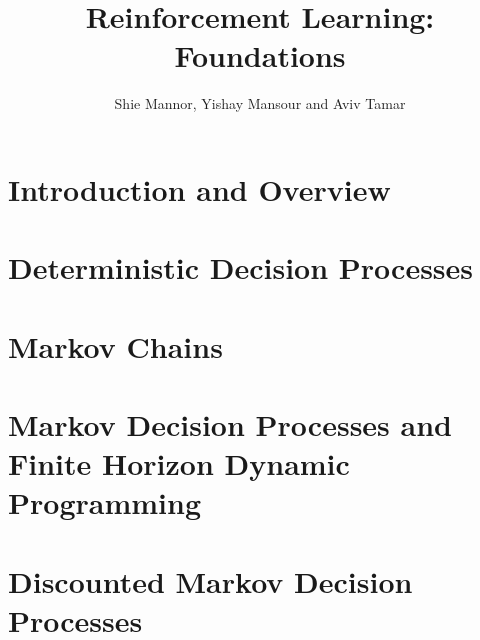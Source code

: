 \documentclass[12pt]{book}
\title{Reinforcement Learning: Foundations}
\date{February 2022
\\
  \textcolor{red}{This book is still work in progress. In particular, references to literature are not complete. We would be grateful for notification about errors or comments of any kind. }

}                                           %
\author{Shie Mannor, Yishay Mansour and Aviv Tamar}
\begin{document}
\maketitle

\tableofcontents

\chapter{Introduction and Overview}
\label{chapter:intro}


\chapter{Deterministic Decision Processes}
\label{chapter:DDP}


%
%

\chapter{Markov Chains}
\label{chapter:MC}


\chapter{Markov Decision Processes and Finite Horizon Dynamic Programming}
\label{chapter:MDP-FH}




\chapter{Discounted Markov Decision Processes}
\label{chapter:disc}

% 

% 
\end{document}
